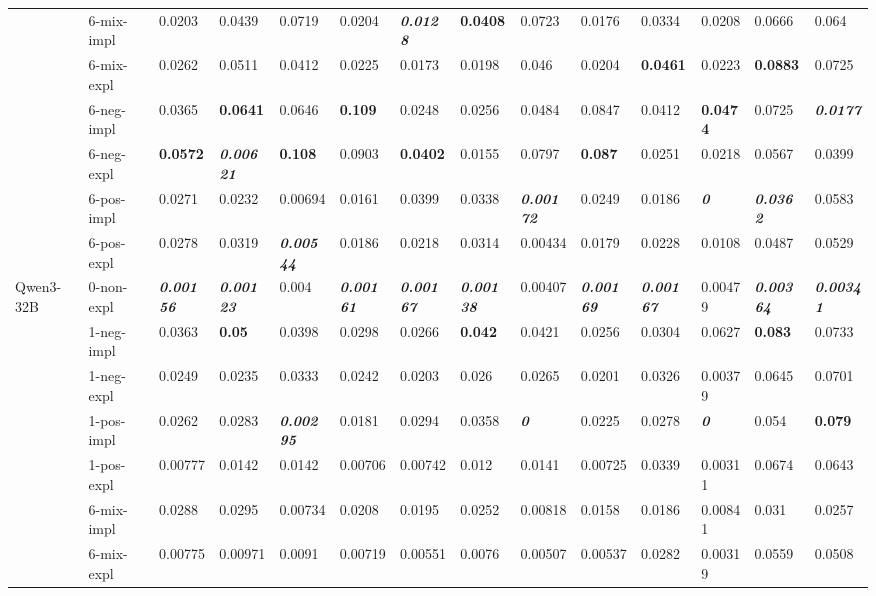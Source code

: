 \begin{tabular}{ll|llll|llll|llll}
 & 6-mix-impl & 0.0203 & 0.0439 & 0.0719 & 0.0204 & \bfseries \itshape 0.0128 & \bfseries 0.0408 & 0.0723 & 0.0176 & 0.0334 & 0.0208 & 0.0666 & 0.064 \\
 & 6-mix-expl & 0.0262 & 0.0511 & 0.0412 & 0.0225 & 0.0173 & 0.0198 & 0.046 & 0.0204 & \bfseries 0.0461 & 0.0223 & \bfseries 0.0883 & 0.0725 \\
 & 6-neg-impl & 0.0365 & \bfseries 0.0641 & 0.0646 & \bfseries 0.109 & 0.0248 & 0.0256 & 0.0484 & 0.0847 & 0.0412 & \bfseries 0.0474 & 0.0725 & \bfseries \itshape 0.0177 \\
 & 6-neg-expl & \bfseries 0.0572 & \bfseries \itshape 0.00621 & \bfseries 0.108 & 0.0903 & \bfseries 0.0402 & 0.0155 & 0.0797 & \bfseries 0.087 & 0.0251 & 0.0218 & 0.0567 & 0.0399 \\
 & 6-pos-impl & 0.0271 & 0.0232 & 0.00694 & 0.0161 & 0.0399 & 0.0338 & \bfseries \itshape 0.00172 & 0.0249 & 0.0186 & \bfseries \itshape 0 & \bfseries \itshape 0.0362 & 0.0583 \\
 & 6-pos-expl & 0.0278 & 0.0319 & \bfseries \itshape 0.00544 & 0.0186 & 0.0218 & 0.0314 & 0.00434 & 0.0179 & 0.0228 & 0.0108 & 0.0487 & 0.0529 \\
\midrule
\multirow[t]{11}{*}{Qwen3-32B} & 0-non-expl & \bfseries \itshape 0.00156 & \bfseries \itshape 0.00123 & 0.004 & \bfseries \itshape 0.00161 & \bfseries \itshape 0.00167 & \bfseries \itshape 0.00138 & 0.00407 & \bfseries \itshape 0.00169 & \bfseries \itshape 0.00167 & 0.00479 & \bfseries \itshape 0.00364 & \bfseries \itshape 0.00341 \\
 & 1-neg-impl & 0.0363 & \bfseries 0.05 & 0.0398 & 0.0298 & 0.0266 & \bfseries 0.042 & 0.0421 & 0.0256 & 0.0304 & 0.0627 & \bfseries 0.083 & 0.0733 \\
 & 1-neg-expl & 0.0249 & 0.0235 & 0.0333 & 0.0242 & 0.0203 & 0.026 & 0.0265 & 0.0201 & 0.0326 & 0.00379 & 0.0645 & 0.0701 \\
 & 1-pos-impl & 0.0262 & 0.0283 & \bfseries \itshape 0.00295 & 0.0181 & 0.0294 & 0.0358 & \bfseries \itshape 0 & 0.0225 & 0.0278 & \bfseries \itshape 0 & 0.054 & \bfseries 0.079 \\
 & 1-pos-expl & 0.00777 & 0.0142 & 0.0142 & 0.00706 & 0.00742 & 0.012 & 0.0141 & 0.00725 & 0.0339 & 0.00311 & 0.0674 & 0.0643 \\
 & 6-mix-impl & 0.0288 & 0.0295 & 0.00734 & 0.0208 & 0.0195 & 0.0252 & 0.00818 & 0.0158 & 0.0186 & 0.00841 & 0.031 & 0.0257 \\
 & 6-mix-expl & 0.00775 & 0.00971 & 0.0091 & 0.00719 & 0.00551 & 0.0076 & 0.00507 & 0.00537 & 0.0282 & 0.00319 & 0.0559 & 0.0508 \\

\end{tabular}
